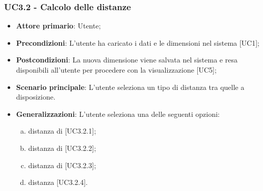 \subsubsection{UC3.2 - Calcolo delle distanze}
\begin{itemize}
	\item \textbf{Attore primario}: Utente;
	\item \textbf{Precondizioni}: L'utente ha caricato i dati e le dimensioni nel sistema [UC1];
	\item \textbf{Postcondizioni}: La nuova dimensione viene salvata nel sistema e resa disponibili all'utente per procedere con la visualizzazione [UC5];

	\item \textbf{Scenario principale}: L'utente seleziona un tipo di distanza tra quelle a disposizione.
	
	\item \textbf{Generalizzazioni}: L'utente seleziona una delle seguenti opzioni:
	
	\begin{enumerate}[(a)]
		\item distanza di  [UC3.2.1];
		\item distanza di  [UC3.2.2];
		\item distanza di  [UC3.2.3];
		\item distanza  [UC3.2.4].
	\end{enumerate}
\end{itemize}